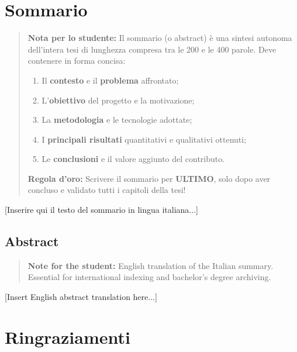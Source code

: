 \documentclass[12pt, a4paper, oneside]{book}
\begin{document}
\justifying

\frontmatter

\chapter*{Sommario}

\begin{quote}
\textbf{Nota per lo studente:} Il sommario (o abstract) è una sintesi autonoma dell'intera tesi di lunghezza compresa tra le 200 e le 400 parole. 
Deve contenere in forma concisa:
\begin{enumerate}
    \item Il \textbf{contesto} e il \textbf{problema} affrontato;
    \item L'\textbf{obiettivo} del progetto e la motivazione;
    \item La \textbf{metodologia} e le tecnologie adottate;
    \item I \textbf{principali risultati} quantitativi e qualitativi ottenuti;
    \item Le \textbf{conclusioni} e il valore aggiunto del contributo.
\end{enumerate}
\textbf{Regola d'oro:} Scrivere il sommario per \textbf{ULTIMO}, solo dopo aver concluso e validato tutti i capitoli della tesi!
\end{quote}

[Inserire qui il testo del sommario in lingua italiana...]

\vspace{1.5cm}

\section*{Abstract}
\begin{quote}
\textbf{Note for the student:} English translation of the Italian summary. Essential for international indexing and bachelor's degree archiving.
\end{quote}

[Insert English abstract translation here...]

\cleardoublepage

\chapter*{Ringraziamenti}
\end{document}
